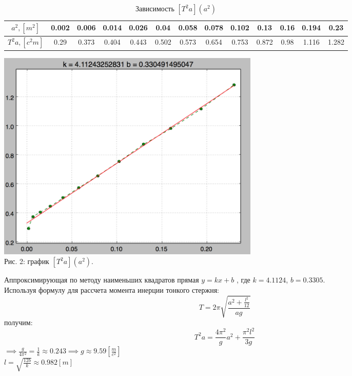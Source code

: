 \documentclass[12pt]{article}
\begin{document}
\begin{enumerate}
        \begin{table}[h]
            \caption{Зависимость $[T^2 a ](a^2)$}
            \begin{center}
                \begin{tabular}{|c|c|c|c|c|c|c|c|c|c|c|c|c|}
                    \hline
                        $a^2 , [m^2]$ & 0.002 & 0.006 & 0.014 & 0.026 & 0.04 & 0.058 & 0.078 & 0.102 & 0.13 & 0.16 & 0.194 & 0.23 \\
                    \hline
                        $T^2 a , [c^2 m] $ & 0.29 & 0.373 & 0.404 & 0.443 & 0.502 & 0.573 & 0.654 & 0.753 & 0.872 & 0.98 & 1.116 & 1.282 \\
                    \hline
                \end{tabular}
            \end{center}
        \end{table}

        \begin{center} 
            \includegraphics[width=5in]{figure.png} \\ Рис. 2: график $[T^2 a ] (a^2)$.
        \end{center}
        Аппроксимирующая по методу наименьших квадратов прямая $y = kx + b$ , где $k = 4.1124$, $b = 0.3305$.
        \\
        Используя формулу для рассчета момента инерции тонкого стержня:
        \begin{equation}
              T = 2 \pi \sqrt{\frac{a^2 + \frac{l^2}{12}}{ag}}     
        \end{equation}
        получим: 
        \begin{equation}
              T^2a = \frac{4 \pi^2 } {g} a^2 + \frac{\pi^2 l^2}{3 g}
        \end{equation}
        $\implies \frac{g}{4\pi^2} = \frac{1}{k} \approx 0.243 \implies g \approx 9.59 [\frac{m}{c^2}]$ \\
        $l = \sqrt{\frac{12b}{k}} \approx 0.982[m]$ \\
        
    \end{enumerate} 
\end{document}
